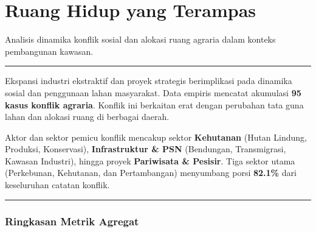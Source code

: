 \documentclass[
]{article}
\author{}
\date{}
\begin{document}
\section{Ruang Hidup yang Terampas}\label{ruang-hidup-yang-terampas}

Analisis dinamika konflik sosial dan alokasi ruang agraria dalam konteks
pembangunan kawasan.

\begin{center}\rule{0.5\linewidth}{0.5pt}\end{center}

Ekspansi industri ekstraktif dan proyek strategis berimplikasi pada
dinamika sosial dan penggunaan lahan masyarakat. Data empiris mencatat
akumulasi \textbf{95 kasus konflik agraria}. Konflik ini berkaitan erat
dengan perubahan tata guna lahan dan alokasi ruang di berbagai daerah.

Aktor dan sektor pemicu konflik mencakup sektor \textbf{Kehutanan}
(Hutan Lindung, Produksi, Konservasi), \textbf{Infrastruktur \& PSN}
(Bendungan, Transmigrasi, Kawasan Industri), hingga proyek
\textbf{Pariwisata \& Pesisir}. Tiga sektor utama (Perkebunan,
Kehutanan, dan Pertambangan) menyumbang porsi \textbf{82.1\%} dari
keseluruhan catatan konflik.

\begin{center}\rule{0.5\linewidth}{0.5pt}\end{center}

\subsubsection{Ringkasan Metrik Agregat}\label{ringkasan-metrik-agregat}
\end{document}
